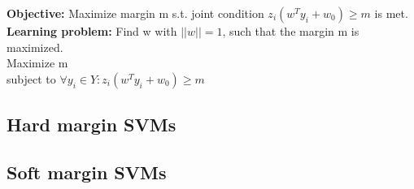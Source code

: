\documentclass[main]{subfiles}
\begin{document}
\textbf{Objective:} Maximize margin m s.t. joint condition \(z_i (w^T y_i + w_0 ) \geq m\) is met.\\

\textbf{Learning problem:} Find w with \(||w|| = 1\), such that the margin m
is maximized.\\
Maximize m\\
subject to \(\forall y_i \in Y : z_i (w^T y_i + w_0 ) \geq m\)
\subsection{Hard margin SVMs}
\subsection{Soft margin SVMs}
\end{document}
